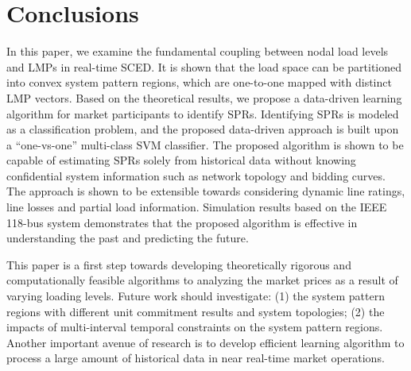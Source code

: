 \documentclass[letterpaper, 11pt]{article}
\theoremstyle{plain}
\theoremstyle{definition}
\begin{document}
\section{Conclusions} \label{sec:conclusion}
In this paper, we examine the fundamental coupling between nodal load levels and LMPs in real-time SCED.
It is shown that the load space can be partitioned into convex system pattern regions, which are one-to-one mapped with distinct LMP vectors. 
Based on the theoretical results, we propose a data-driven learning algorithm for market participants to identify SPRs. 
Identifying SPRs is modeled as a classification problem, and the proposed data-driven approach is built upon a ``one-vs-one'' multi-class SVM classifier. 
The proposed algorithm is shown to be capable of estimating SPRs solely from historical data without knowing confidential system information such as network topology and bidding curves.
The approach is shown to be extensible towards considering dynamic line ratings, line losses and partial load information. 
Simulation results based on the IEEE 118-bus system demonstrates that the proposed algorithm is effective in understanding the past and predicting the future.

This paper is a first step towards developing theoretically
rigorous and computationally feasible algorithms to analyzing
the market prices as a result of varying loading levels. Future
work should investigate: (1) the system pattern regions with
different unit commitment results and system topologies; (2)
the impacts of multi-interval temporal constraints on the
system pattern regions. Another important avenue of research
is to develop efficient learning algorithm to process a large
amount of historical data in near real-time market operations.



\appendices
\end{document}
